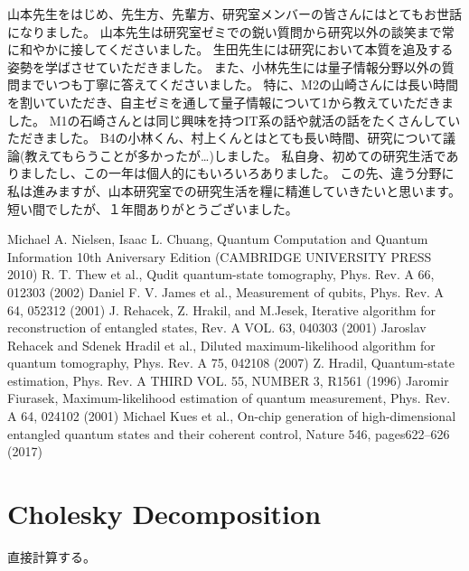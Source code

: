 \documentclass[11pt,a4j,notitlepage]{jreport}
\begin{document}
	山本先生をはじめ、先生方、先輩方、研究室メンバーの皆さんにはとてもお世話になりました。
	山本先生は研究室ゼミでの鋭い質問から研究以外の談笑まで常に和やかに接してくださいました。
	生田先生には研究において本質を追及する姿勢を学ばさせていただきました。
	また、小林先生には量子情報分野以外の質問までいつも丁寧に答えてくださいました。
	特に、M2の山崎さんには長い時間を割いていただき、自主ゼミを通して量子情報について1から教えていただきました。
	M1の石崎さんとは同じ興味を持つIT系の話や就活の話をたくさんしていただきました。
	B4の小林くん、村上くんとはとても長い時間、研究について議論(教えてもらうことが多かったが…)しました。
	私自身、初めての研究生活でありましたし、この一年は個人的にもいろいろありました。
	この先、違う分野に私は進みますが、山本研究室での研究生活を糧に精進していきたいと思います。
	短い間でしたが、１年間ありがとうございました。



	\begin{thebibliography}{99}
		\bibitem{}  Michael A. Nielsen, Isaac L. Chuang, Quantum Computation and Quantum Information 10th Aniversary Edition (CAMBRIDGE UNIVERSITY PRESS 2010)
		\bibitem{}  R. T. Thew et al., Qudit quantum-state tomography, Phys. Rev. A 66, 012303 (2002)
		\bibitem{}  Daniel F. V. James et al., Measurement of qubits, Phys. Rev. A 64, 052312 (2001)
		\bibitem{}  J. Rehacek, Z. Hrakil, and M.Jesek, Iterative algorithm for reconstruction of entangled states, Rev. A VOL. 63, 040303 (2001)
		\bibitem{}  Jaroslav Rehacek and Sdenek Hradil et al., Diluted maximum-likelihood algorithm for quantum tomography, Phys. Rev. A 75, 042108 (2007)                                
		\bibitem{}  Z. Hradil, Quantum-state estimation, Phys. Rev. A THIRD VOL. 55, NUMBER 3, R1561 (1996)
		\bibitem{}  Jaromir Fiurasek, Maximum-likelihood estimation of quantum measurement, Phys. Rev. A 64, 024102 (2001)
		  Michael Kues et al., On-chip generation of high-dimensional entangled quantum states and their coherent control, Nature 546, pages622–626 (2017) 
	\end{thebibliography}
	


	\appendix

	\chapter{Cholesky Decomposition}
	\label{chap:Cholesky}

	直接計算する。\\
\end{document}
